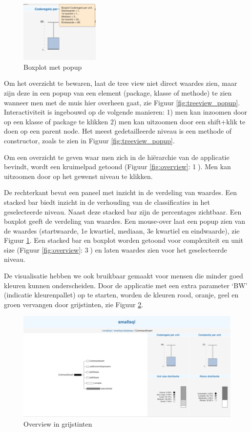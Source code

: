 \documentclass[a4paper]{article}
\begin{document}
\begin{figure}
\begin{center}
  \includegraphics[width=0.35\textwidth]{images/boxplot_popup.png}
  \end{center}
  \caption{Boxplot met popup}
  \label{fig:boxplot_popup}
\end{figure}
Om het overzicht te bewaren, laat de tree view niet direct waardes zien, maar zijn deze in een popup van een element (package, klasse of methode) te zien wanneer men met de muis hier overheen gaat, zie Figuur \ref{fig:treeview_popup}. Interactiviteit is ingebouwd op de volgende manieren: 1) men kan inzoomen door op een klasse of package te klikken 2) men kan uitzoomen door een shift+klik te doen op een parent node. Het meest gedetailleerde niveau is een methode of constructor, zoals te zien in Figuur \ref{fig:treeview_popup}.

Om een overzicht te geven waar men zich in de hiërarchie van de applicatie bevindt, wordt een kruimelpad getoond (Figuur \ref{fig:overview}: \textcircled{1}). Men kan uitzoomen door op het gewenst niveau te klikken.


De rechterkant bevat een paneel met inzicht in de verdeling van waardes. Een stacked bar biedt inzicht in de verhouding van de classificaties in het \mbox{geselecteerde} niveau. Naast deze stacked bar zijn de percentages zichtbaar. Een boxplot geeft de verdeling van waardes. Een mouse-over laat een popup zien van de waardes (startwaarde, 1e kwartiel, mediaan, 3e kwartiel en eindwaarde), zie Figuur \ref{fig:boxplot_popup}.
Een stacked bar en boxplot worden getoond voor complexiteit en unit size (Figuur \ref{fig:overview}: \textcircled{3}) en laten waardes zien voor het geselecteerde niveau.

De visualisatie hebben we ook bruikbaar gemaakt voor mensen die minder goed kleuren kunnen onderscheiden. Door de applicatie met een extra parameter ‘BW’ (indicatie kleurenpallet) op te starten, worden de kleuren rood, oranje, geel en groen vervangen door grijstinten, zie Figuur \ref{fig:overview_blackwhite}.
\begin{figure}[h]
\centering
  \includegraphics[width=0.8\linewidth]{images/overview_blackwhite.png}
  \caption{Overview in grijstinten}
  \label{fig:overview_blackwhite}
\end{figure}
\end{document}
